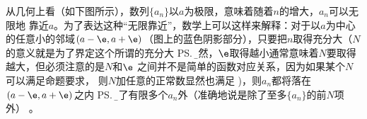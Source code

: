 从几何上看（如下图所示），数列$\{a_n\}$以$a$为极限，意味着随着$n$的增大，$a_n$可以无限地
靠近$a$。为了表达这种“无限靠近”，数学上可以这样来解释：对于以$a$为中心的任意小的邻域$(a-\e,
a+\e)$（图上的蓝色阴影部分），只要把$n$取得充分大（$N$的意义就是为了界定这个所谓的充分大
\ps{\b 显然，$\e$取得越小通常意味着$N$要取得越大，但必须注意的是$N$和$\e$
之间并不是简单的函数对应关系，因为如果某个$N$可以满足命题要求，
则$N$加任意的正常数显然也满足}
)，则$a_n$都将落在$(a-\e,a+\e)$之内
\ps{\b 除了有限多个$a_n$外（准确地说是除了至多$\{a_n\}$的前$N$项外）}
。

\begin{center}
	\quad
	

\end{center}
